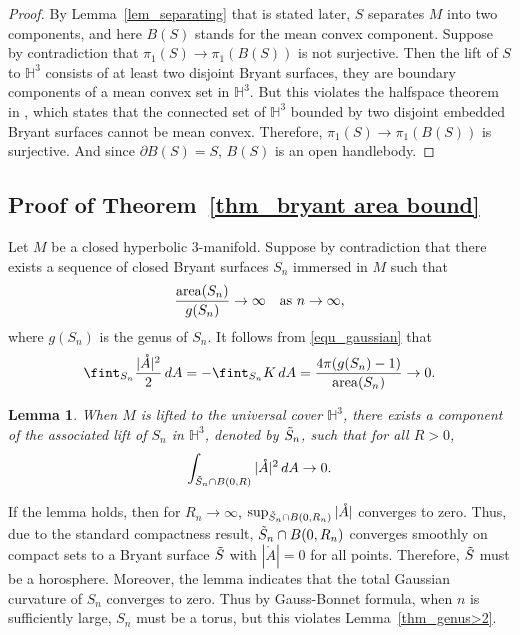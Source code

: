 \documentclass[12pt,a4paper]{amsart}
\numberwithin{equation}{section}
\theoremstyle{plain}
\newtheorem{Lemma}[Th]{Lemma}
\theoremstyle{named}
\theoremstyle{definition}
\newcommand{\area}{{\rm{area}}}
\begin{document}
\begin{proof}
By Lemma~\ref{lem_separating} that is stated later, $S$ separates $M$ into two components, and here $B(S)$ stands for the mean convex component. 
Suppose by contradiction that $\pi_1(S)\rightarrow \pi_1(B(S))$ is not surjective. Then the lift of $S$ to $\mathbb{H}^3$ consists of at least two disjoint Bryant surfaces, they are boundary components of a mean convex set in $\mathbb{H}^3$. But this violates the halfspace theorem in \cite{Rodriguez-Rosenberg}, which states that the connected set of $\mathbb{H}^3$ bounded by two disjoint embedded Bryant surfaces cannot be mean convex. Therefore, $\pi_1(S)\rightarrow \pi_1(B(S))$ is surjective. And since $\partial B(S)=S$, $B(S)$ is an open handlebody.
\end{proof}



\subsection{Proof of Theorem~\ref{thm_bryant area bound}}
Let $M$ be a closed hyperbolic $3$-manifold.
Suppose by contradiction that there exists a sequence of closed Bryant surfaces $S_n$ immersed in $M$ such that \begin{equation*}
    \frac{\area(S_n)}{g(S_n)}\rightarrow \infty\quad \text{as }n\rightarrow \infty,
\end{equation*}
where $g(S_n)$ is the genus of $S_n$. 
It follows from \eqref{equ_gaussian} that \begin{equation*}
    \fint_{S_n}\frac{|\mathring{A}|^2}{2}\,dA=-\fint_{S_n}K\,dA=\frac{4\pi(g(S_n)-1)}{\area(S_n)}\rightarrow 0.
\end{equation*}



\begin{Lemma}\label{lemma_total_curvature}
When $M$ is lifted to the universal cover $\mathbb{H}^3$, there exists a component of the associated lift of $S_n$ in $\mathbb{H}^3$, denoted by $\Tilde{S}_n$, such that for all $R>0$,
    \begin{equation*}
        \int_{\Tilde{S}_n\cap B(0,R)}|\mathring{A}|^2\,dA\rightarrow 0.
    \end{equation*}
\end{Lemma}

If the lemma holds, then for $R_n\rightarrow \infty$, $\sup_{\Tilde{S}_n\cap B(0,R_n)} |\mathring{A}|$ converges to zero. Thus, due to the standard compactness result, $\Tilde{S}_n\cap B(0,R_n)$ converges smoothly on compact sets to a Bryant surface $\Tilde{S}$ with $|\mathring{A}|=0$ for all points. Therefore, $\Tilde{S}$ must be a horosphere. Moreover, the lemma indicates that the total Gaussian curvature of $S_n$ converges to zero. Thus by Gauss-Bonnet formula, when $n$ is sufficiently large, $S_n$ must be a torus, but this violates Lemma~\ref{thm_genus>2}.
\end{document}
